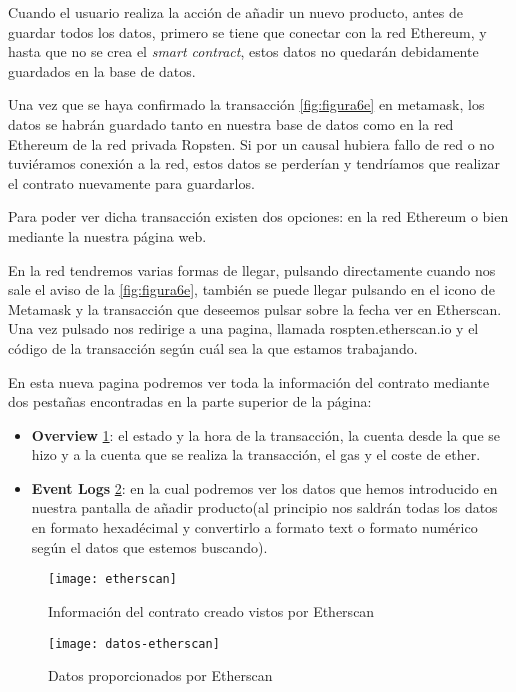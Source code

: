 Cuando el usuario realiza la acción de añadir un nuevo producto, antes de guardar todos los datos, primero se tiene que conectar con la red Ethereum, y hasta que no se crea el \textit{smart contract}, estos datos no quedarán debidamente guardados en la base de datos. 
 
Una vez que se haya confirmado la transacción \ref{fig:figura6e} en metamask, los datos se habrán guardado tanto en nuestra base de datos como en la red Ethereum de la red privada Ropsten. Si por un causal hubiera fallo de red o no tuviéramos conexión a la red, estos datos se perderían y tendríamos que realizar el contrato nuevamente para guardarlos. 

Para poder ver dicha transacción existen dos opciones: en la red Ethereum o bien mediante la nuestra página web.

En la red tendremos varias formas de llegar, pulsando directamente cuando nos sale el aviso de la \ref{fig:figura6e}, también se puede llegar pulsando en el icono de Metamask y la transacción que deseemos pulsar sobre la fecha ver en Etherscan. Una vez pulsado nos redirige a una pagina, llamada rospten.etherscan.io y el código de la transacción según cuál sea la que estamos trabajando.

En esta nueva pagina podremos ver toda la información del contrato mediante dos pestañas encontradas en la parte superior de la página:\hfill

\begin{itemize}
 \item  \textbf{Overview} \ref{fig:figura7e}: el estado y la hora de la transacción, la cuenta desde la que se hizo y a la cuenta que se realiza la transacción, el gas y el coste de ether. 
 
 \item \textbf{Event Logs} \ref{fig:figura8e}: en la cual podremos ver los datos que hemos introducido en nuestra pantalla de añadir producto(al principio nos saldrán todas los datos en formato hexadécimal y convertirlo a formato text o formato numérico según el datos que estemos buscando).
 \end{itemize}
 \begin{figure}[H]
    \centering
    \texttt{[image: etherscan]}
    \caption{Información del contrato creado vistos por Etherscan}
    \label{fig:figura7e}
\end{figure}
\begin{figure}[H]
    \centering
    \texttt{[image: datos-etherscan]}
    \caption{Datos proporcionados por Etherscan}
    \label{fig:figura8e}
\end{figure}


